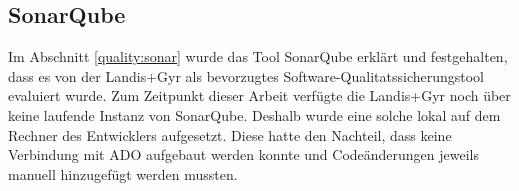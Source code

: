 \subsection{SonarQube}
Im Abschnitt \ref{quality:sonar} wurde das Tool SonarQube erklärt und festgehalten, dass es von der Landis+Gyr als bevorzugtes Software-Qualitatssicherungstool evaluiert wurde.
Zum Zeitpunkt dieser Arbeit verfügte die Landis+Gyr noch über keine laufende Instanz von SonarQube.
Deshalb wurde eine solche lokal auf dem Rechner des Entwicklers aufgesetzt.
Diese hatte den Nachteil, dass keine Verbindung mit \ac{ADO} aufgebaut werden konnte und Codeänderungen jeweils manuell hinzugefügt werden mussten.


